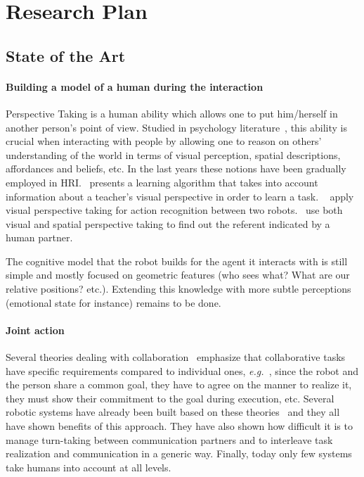 \documentclass{report}
\newcommand{\eg}{{\textit{e.g.\ }}}
\begin{document}
\section{Research Plan}

\subsection{State of the Art}

\paragraph{Building a model of a human during the interaction} Perspective
Taking is a human ability which allows one to put him/herself in another
person's point of view. Studied in psychology
literature~\cite{Flavell1992,Tversky1999}, this ability is crucial when
interacting with people by allowing one to reason on others' understanding of
the world in terms of visual perception, spatial descriptions, affordances and
beliefs, etc.  In the last years these notions have been gradually employed in
HRI.~\cite{Breazeal2006} presents a learning algorithm that takes into account
information about a teacher's visual perspective in order to learn a task.
~\cite{Johnson2005} apply visual perspective taking for action recognition
between two robots.~\cite{Trafton2005} use both visual and spatial perspective
taking to find out the referent indicated by a human partner.

The cognitive model that the robot builds for the agent it interacts with is
still simple and mostly focused on geometric features (who sees what? What are
our relative positions? etc.). Extending this knowledge with more subtle
perceptions (emotional state for instance) remains to be done.

\paragraph{Joint action}
Several theories dealing with collaboration~\cite{Cohen1991,Grosz1996,Clark1996}
emphasize that collaborative tasks have specific requirements compared to
individual ones, \eg, since the robot and the person share a common goal, they
have to agree on the manner to realize it, they must show their commitment to
the goal during execution, etc. Several robotic systems have already been built
based on these theories~\cite{Rich1997,Sidner2005,Breazeal2003} and they all
have shown benefits of this approach. They have also shown how difficult it is
to manage turn-taking between communication partners and to interleave task
realization and communication in a generic way. Finally, today only few
systems~\cite{Fong2006,Breazeal2003,Sisbot2008} take humans into account at all
levels.
\end{document}
